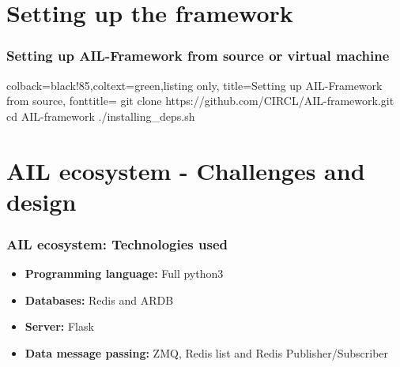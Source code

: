 \documentclass{beamer}
\begin{document}
\section{Setting up the framework}
\lstset{style=bash}
\begin{frame}[fragile]
    \frametitle{Setting up AIL-Framework from source or virtual machine}
    \begin{tcblisting}{colback=black!85,coltext=green,listing only,
        title=Setting up AIL-Framework from source, fonttitle=\bfseries}
git clone https://github.com/CIRCL/AIL-framework.git
cd AIL-framework
./installing_deps.sh
\end{tcblisting}
\end{frame}

\section{AIL ecosystem - Challenges and design}
\begin{frame}
    \frametitle{AIL ecosystem: Technologies used}
    \begin{itemize}
        \item[] \textbf{Programming language:} Full python3
        \item[] \textbf{Databases:} Redis and ARDB
        \item[] \textbf{Server:} Flask
        \item[] \textbf{Data message passing:} ZMQ, Redis list and Redis Publisher/Subscriber
    \end{itemize}
\end{frame}
\end{document}
